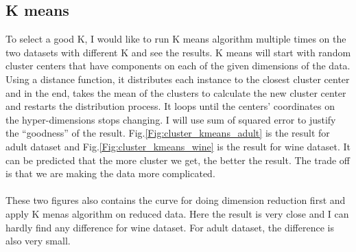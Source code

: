 \documentclass[11pt]{article}
\begin{document}
\subsection{K means}
To select a good K, I would like to run K means algorithm multiple times on the two datasets with different K and see the results. K means will start with random cluster centers that have components on each of the given dimensions of the data. Using a distance function, it distributes each instance to the closest cluster center and in the end, takes the mean of the clusters to calculate the new cluster center and restarts the distribution process. It loops until the centers’ coordinates on the hyper-dimensions stops changing. I will use sum of squared error to justify the ``goodness'' of the result. Fig.\ref{Fig:cluster_kmeans_adult} is the result for adult dataset and Fig.\ref{Fig:cluster_kmeans_wine} is the result for wine dataset. It can be predicted that the more cluster we get, the better the result. The trade off is that we are making the data more complicated. \\
\\
These two figures also contains the curve for doing dimension reduction first and apply K menas algorithm on reduced data. Here the result is very close and I can hardly find any difference for wine dataset. For adult dataset, the difference is also very small.\\
\\
\end{document}
